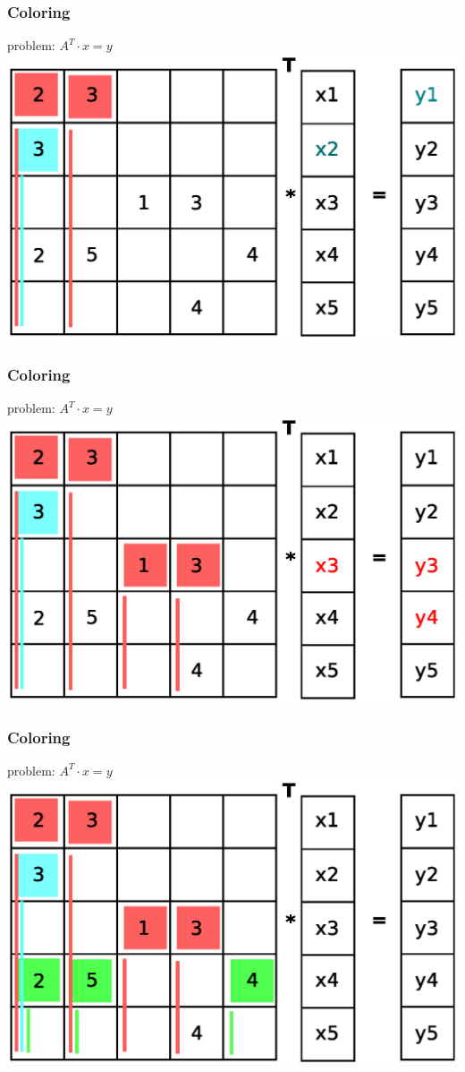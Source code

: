 \documentclass{beamer}
\begin{document}
\begin{frame}
\frametitle{Coloring}
problem: $A^T \cdot x= y$
\includegraphics[width=0.8\linewidth]{graphic/coloringT7.eps}
\end{frame}

\begin{frame}
\frametitle{Coloring}
problem: $A^T \cdot x= y$
\includegraphics[width=0.8\linewidth]{graphic/coloringT8.eps}
\end{frame}

\begin{frame}
\frametitle{Coloring}
problem: $A^T \cdot x= y$
\includegraphics[width=0.8\linewidth]{graphic/coloringT9.eps}
\end{frame}
\end{document}
